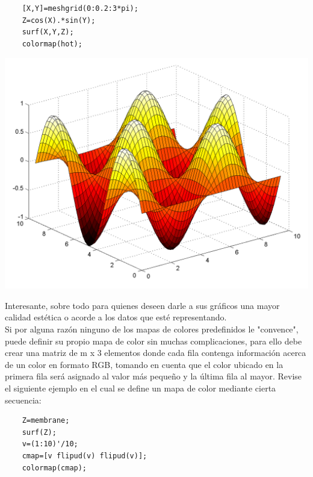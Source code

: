 \begin{verbatim}
	[X,Y]=meshgrid(0:0.2:3*pi);
	Z=cos(X).*sin(Y);
	surf(X,Y,Z);
	colormap(hot);
\end{verbatim}

\begin{center}
\includegraphics[scale=0.6]{src/ch4/img_4_10.png}
\end{center}

Interesante, sobre todo para quienes deseen darle a sus gráficos una mayor calidad 
estética o acorde a los datos que esté representando.\\

Si por alguna razón ninguno de los mapas de colores predefinidos le "convence", puede 
definir su propio mapa de color sin muchas complicaciones, para ello debe crear una 
matriz de m x 3 elementos donde cada fila contenga información acerca de un color en 
formato RGB, tomando en cuenta que el color ubicado en la primera fila será asignado 
al valor más pequeño y la última fila al mayor. Revise el siguiente ejemplo en el 
cual se define un mapa de color mediante cierta secuencia:

\begin{verbatim}
	Z=membrane;
	surf(Z);
	v=(1:10)'/10;
	cmap=[v flipud(v) flipud(v)];
	colormap(cmap);
\end{verbatim}

